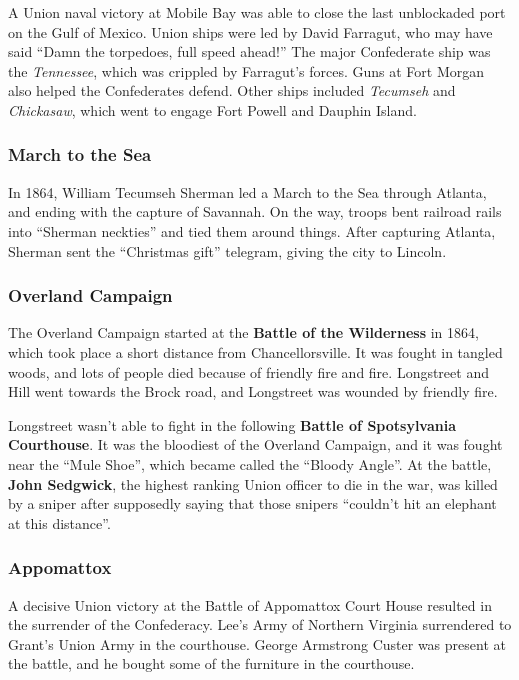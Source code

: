 A Union naval victory at Mobile Bay was able to close the last unblockaded port on the Gulf of Mexico.
Union ships were led by David Farragut, who may have said ``Damn the torpedoes, full speed ahead!''
The major Confederate ship was the \textit{Tennessee}, which was crippled by Farragut's forces.
Guns at Fort Morgan also helped the Confederates defend.
Other ships included \textit{Tecumseh} and \textit{Chickasaw},
which went to engage Fort Powell and Dauphin Island.

\subsubsection*{March to the Sea}

In 1864, William Tecumseh Sherman led a March to the Sea through Atlanta, and ending with the capture of Savannah.
On the way, troops bent railroad rails into ``Sherman neckties'' and tied them around things.
After capturing Atlanta, Sherman sent the ``Christmas gift'' telegram, giving the city to Lincoln.

\subsubsection*{Overland Campaign}

The Overland Campaign started at the \textbf{Battle of the Wilderness} in 1864,
which took place a short distance from Chancellorsville.
It was fought in tangled woods, and lots of people died because of friendly fire and fire.
Longstreet and Hill went towards the Brock road, and Longstreet was wounded by friendly fire.

Longstreet wasn't able to fight in the following \textbf{Battle of Spotsylvania Courthouse}.
It was the bloodiest of the Overland Campaign, and it was fought near the ``Mule Shoe'',
which became called the ``Bloody Angle''.
At the battle, \textbf{John Sedgwick}, the highest ranking Union officer to die in the war,
was killed by a sniper after supposedly saying that those snipers ``couldn't hit an elephant at this distance''.

\subsubsection*{Appomattox}

A decisive Union victory at the Battle of Appomattox Court House resulted in the surrender of the Confederacy.
Lee's Army of Northern Virginia surrendered to Grant's Union Army in the courthouse.
George Armstrong Custer was present at the battle, and he bought some of the furniture in the courthouse.

